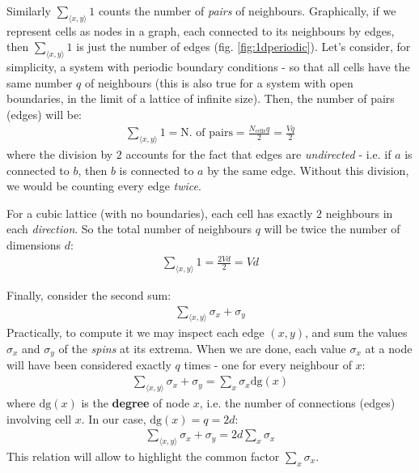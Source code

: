 \documentclass[../../main.tex]{subfiles}
\begin{document}
\medskip

Similarly $\sum_{\langle x,y \rangle} 1$ counts the number of \textit{pairs} of neighbours. Graphically, if we represent cells as nodes in a graph, each connected to its neighbours by edges, then $\sum_{\langle x,y \rangle} 1$ is just the number of edges (fig. \ref{fig:1dperiodic}). Let's consider, for simplicity, a system with periodic boundary conditions - so that all cells have the same number $q$ of neighbours (this is also true for a system with open boundaries, in the limit of a lattice of infinite size). Then, the number of pairs (edges) will be:
\begin{align*}
    \sum_{\langle x,y \rangle} 1 = \text{N. of pairs} = \frac{N_{\mathrm{cells}} q}{2} = \frac{Vq}{2} 
\end{align*}
where the division by $2$ accounts for the fact that edges are \textit{undirected} - i.e. if $a$ is connected to $b$, then $b$ is connected to $a$ by the same edge. Without this division, we would be counting every edge \textit{twice}.  

\medskip

For a cubic lattice (with no boundaries), each cell has exactly $2$ neighbours in each \textit{direction}. So the total number of neighbours $q$ will be twice the number of dimensions $d$:
\begin{align}\label{eqn:sum2}
    \sum_{\langle x,y \rangle} 1 = \frac{2 V d}{2} = V d 
\end{align}

Finally, consider the second sum:
\begin{align*}
    \sum_{\langle x,y \rangle} \sigma_x + \sigma_y
\end{align*}
Practically, to compute it we may inspect each edge $(x,y)$, and sum the values $\sigma_x$ and $\sigma_y$ of the \textit{spins} at its extrema. When we are done, each value $\sigma_x$ at a node will have been considered exactly $q$ times - one for every neighbour of $x$:
\begin{align}\label{eqn:sum3}
    \sum_{\langle x,y \rangle} \sigma_x + \sigma_y = \sum_x \sigma_x \mathrm{dg}(x) 
\end{align}  
where $\mathrm{dg}(x)$ is the \textbf{degree} of node $x$, i.e. the number of connections (edges) involving cell $x$. In our case, $\mathrm{dg}(x) = q = 2d$:
\begin{align*}
    \sum_{\langle x,y \rangle} \sigma_x + \sigma_y = 2d \sum_x \sigma_x
\end{align*} 
This relation will allow to highlight the common factor $\sum_x \sigma_x$.
\end{document}
